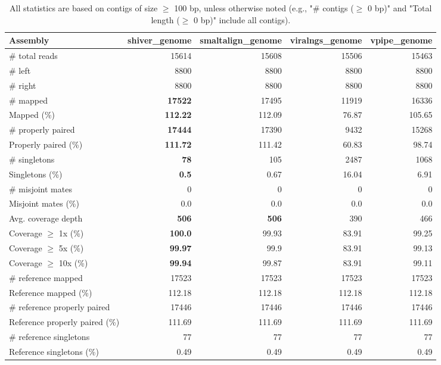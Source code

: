 \documentclass[12pt,a4paper]{article}
\begin{document}
\begin{table}[ht]
\begin{center}
\caption{All statistics are based on contigs of size $\geq$ 100 bp, unless otherwise noted (e.g., "\# contigs ($\geq$ 0 bp)" and "Total length ($\geq$ 0 bp)" include all contigs).}
\begin{tabular}{|l*{4}{|r}|}
\hline
Assembly & shiver\_genome & smaltalign\_genome & viralngs\_genome & vpipe\_genome \\ \hline
\# total reads & 15614 & 15608 & 15506 & 15463 \\ \hline
\# left & 8800 & 8800 & 8800 & 8800 \\ \hline
\# right & 8800 & 8800 & 8800 & 8800 \\ \hline
\# mapped & {\bf 17522} & 17495 & 11919 & 16336 \\ \hline
Mapped (\%) & {\bf 112.22} & 112.09 & 76.87 & 105.65 \\ \hline
\# properly paired & {\bf 17444} & 17390 & 9432 & 15268 \\ \hline
Properly paired (\%) & {\bf 111.72} & 111.42 & 60.83 & 98.74 \\ \hline
\# singletons & {\bf 78} & 105 & 2487 & 1068 \\ \hline
Singletons (\%) & {\bf 0.5} & 0.67 & 16.04 & 6.91 \\ \hline
\# misjoint mates & 0 & 0 & 0 & 0 \\ \hline
Misjoint mates (\%) & 0.0 & 0.0 & 0.0 & 0.0 \\ \hline
Avg. coverage depth & {\bf 506} & {\bf 506} & 390 & 466 \\ \hline
Coverage $\geq$ 1x (\%) & {\bf 100.0} & 99.93 & 83.91 & 99.25 \\ \hline
Coverage $\geq$ 5x (\%) & {\bf 99.97} & 99.9 & 83.91 & 99.13 \\ \hline
Coverage $\geq$ 10x (\%) & {\bf 99.94} & 99.87 & 83.91 & 99.11 \\ \hline
\# reference mapped & 17523 & 17523 & 17523 & 17523 \\ \hline
Reference mapped (\%) & 112.18 & 112.18 & 112.18 & 112.18 \\ \hline
\# reference properly paired & 17446 & 17446 & 17446 & 17446 \\ \hline
Reference properly paired (\%) & 111.69 & 111.69 & 111.69 & 111.69 \\ \hline
\# reference singletons & 77 & 77 & 77 & 77 \\ \hline
Reference singletons (\%) & 0.49 & 0.49 & 0.49 & 0.49 \\ \hline

\end{tabular}
\end{center}
\end{table}
\end{document}
